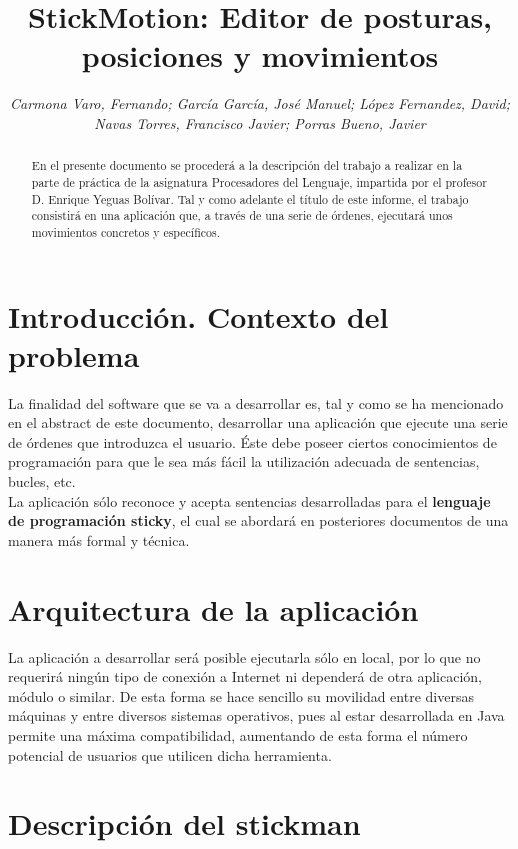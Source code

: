\documentclass[a4paper,12pt]{article}
\title{\textbf{StickMotion:} Editor de posturas, posiciones y movimientos}
\author{\small\textit{Carmona Varo, Fernando; García García, José Manuel; López Fernandez, David;}\\
	\small\textit{Navas Torres, Francisco Javier; Porras Bueno, Javier}}
\begin{document}
  \maketitle %

  \begin{abstract}
    En el presente documento se procederá a la descripción del trabajo a realizar en la parte de práctica de la asignatura Procesadores del
    Lenguaje, impartida por el profesor D. Enrique Yeguas Bolívar. Tal y como adelante el título de este informe, el trabajo consistirá en una
    aplicación que, a través de una serie de órdenes, ejecutará unos movimientos concretos y específicos.\\
  \end{abstract}

  \section{Introducción. Contexto del problema}
  La finalidad del software que se va a desarrollar es, tal y como se ha mencionado en el abstract de este documento, desarrollar una aplicación
  que ejecute una serie de órdenes que introduzca el usuario. Éste debe poseer ciertos conocimientos de programación para que le sea más fácil la
  utilización adecuada de sentencias, bucles, etc. \\
  
  La aplicación sólo reconoce y acepta sentencias desarrolladas para el \textbf{lenguaje de programación sticky}, el cual se abordará en posteriores 
  documentos de una manera más formal y técnica.\\
  
  \section{Arquitectura de la aplicación}
  La aplicación a desarrollar será posible ejecutarla sólo en local, por lo que no requerirá ningún tipo de conexión a Internet ni dependerá de otra
  aplicación, módulo o similar. De esta forma se hace sencillo su movilidad entre diversas máquinas y entre diversos sistemas operativos, pues al 
  estar desarrollada en Java permite una máxima compatibilidad, aumentando de esta forma el número potencial de usuarios que utilicen dicha 
  herramienta.\\
  
  \section{Descripción del stickman}
\end{document}
